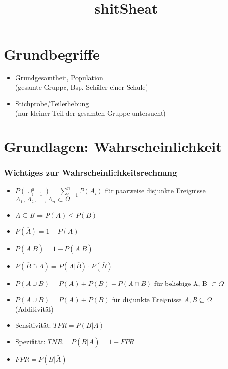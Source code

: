 \documentclass[10pt,a4paper,landscape]{article}
\title{shitSheat}
\newcommand{\setdocumentfont}{\fontsize{6}{8}\selectfont}
\begin{document}
\setdocumentfont
\begin{multicols}{4}
\noindent

\section{Grundbegriffe}

\begin{itemize}
\item Grundgesamtheit, Population\\
	(gesamte Gruppe, Bsp. Schüler einer Schule)
\item Stichprobe/Teilerhebung\\
	(nur kleiner Teil der gesamten Gruppe untersucht)
\end{itemize}




\section{Grundlagen: Wahrscheinlichkeit}

\subsubsection*{Wichtiges zur Wahrscheinlichkeitsrechnung}
\begin{itemize}
\item $P(\cup _{i=1} ^{n}) = \sum_{i=1}^n P(A_i)$ für paarweise disjunkte Ereignisse $A_1, A_2, ~..., A_n \subset \Omega$
\item $A \subseteq B \Rightarrow P(A) \leqslant P(B)$
\item \(P (\overline{A}) = 1 - P(A)\)
\item $P(A|\overline{B})= 1 - P(\overline{A} |\overline{B})$
\item $P(\overline{B}\cap A)=P(A|\overline{B})\cdot P(\overline{B})$
\item $P(A\cup B) = P(A) + P(B) -P(A\cap B)$ für beliebige A, B $\subset \Omega$
\item $P(A \cup B) = P(A) + P(B)$ für disjunkte Ereignisse $A,B \subseteq \Omega$ (Additivität)
\item Sensitivität: $TPR=P(B|A)$
\item Spezifität: $TNR=P(\bar{B}|A)= 1- FPR$
\item $FPR = P(B|\bar{A})$
\end{itemize}


\end{multicols}
\end{document}
